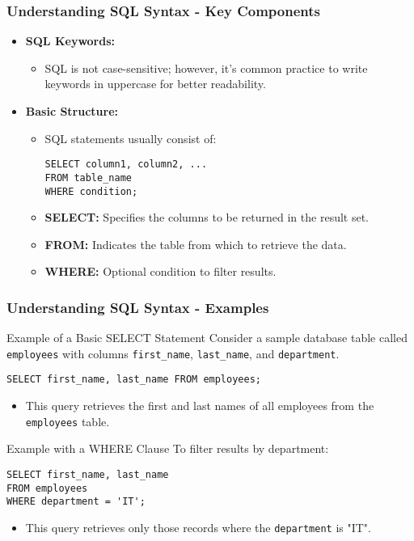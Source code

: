 \documentclass[aspectratio=169]{beamer}
\begin{document}
\begin{frame}[fragile]
    \frametitle{Understanding SQL Syntax - Key Components}
    \begin{itemize}
        \item \textbf{SQL Keywords:} 
        \begin{itemize}
            \item SQL is not case-sensitive; however, it's common practice to write keywords in uppercase for better readability.
        \end{itemize}
        \item \textbf{Basic Structure:} 
        \begin{itemize}
            \item SQL statements usually consist of:
            \begin{lstlisting}
SELECT column1, column2, ...
FROM table_name
WHERE condition;
            \end{lstlisting}
        \end{itemize}
        \begin{itemize}
            \item \textbf{SELECT:} Specifies the columns to be returned in the result set.
            \item \textbf{FROM:} Indicates the table from which to retrieve the data.
            \item \textbf{WHERE:} Optional condition to filter results.
        \end{itemize}
    \end{itemize}
\end{frame}

\begin{frame}[fragile]
    \frametitle{Understanding SQL Syntax - Examples}
    \begin{block}{Example of a Basic SELECT Statement}
        Consider a sample database table called \texttt{employees} with columns \texttt{first_name}, \texttt{last_name}, and \texttt{department}.
        \begin{lstlisting}
SELECT first_name, last_name FROM employees;
        \end{lstlisting}
        \begin{itemize}
            \item This query retrieves the first and last names of all employees from the \texttt{employees} table.
        \end{itemize}
    \end{block}

    \begin{block}{Example with a WHERE Clause}
        To filter results by department:
        \begin{lstlisting}
SELECT first_name, last_name 
FROM employees 
WHERE department = 'IT';
        \end{lstlisting}
        \begin{itemize}
            \item This query retrieves only those records where the \texttt{department} is "IT".
        \end{itemize}
    \end{block}
\end{frame}
\end{document}
